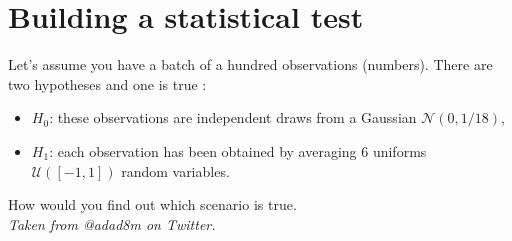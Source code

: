 \section{Building a statistical test}

\begin{tcolorbox}[width=\linewidth, sharp corners=all, colback=white!95!black]
Let's assume you have a batch of a hundred observations (numbers). There are two hypotheses and one is true :
\begin{itemize}
    \item $H_0$: these observations are independent draws from a Gaussian $\mathcal{N}(0, 1/18)$,
    \item $H_1$:  each observation has been obtained by averaging $6$ uniforms $\mathcal{U}([-1,1])$ random variables.
\end{itemize}
How would you find out which scenario is true.\\

\textit{Taken from @adad8m on Twitter.}
\end{tcolorbox}
